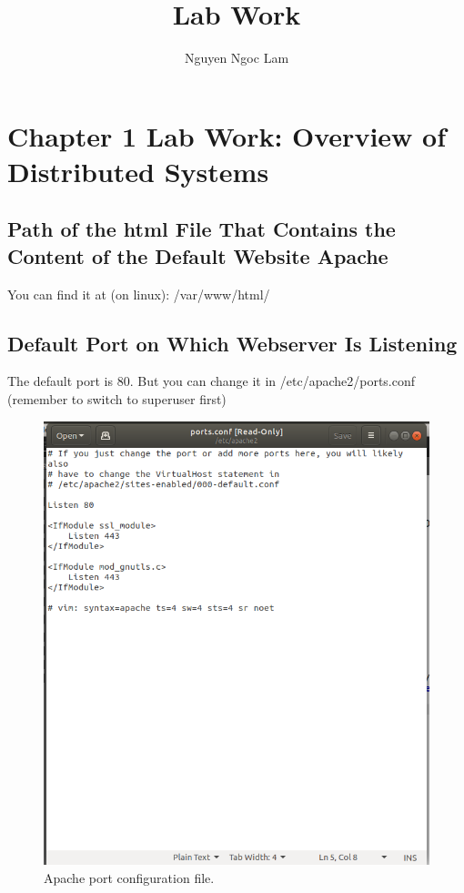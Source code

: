 \documentclass[11pt,a4paper]{report}
\title{Lab Work}
\date{\displaydate{date}}
\author{Nguyen Ngoc Lam}
\begin{document}
  	\tableofcontents
  	\newpage
	
	\chapter{Chapter 1 Lab Work: Overview of Distributed Systems}
	\newpage
	\section{Path of the html File That Contains the Content of the Default Website Apache}
	You can find it at (on linux): /var/www/html/
	\section{Default Port on Which Webserver Is Listening}
	The default port is 80. But you can change it in /etc/apache2/ports.conf (remember to switch to superuser first)
	\begin{figure}[h!]
  		\includegraphics[width=\linewidth]{apache-default-port.png}
  		\caption{Apache port configuration file.}
  		\label{fig:apacheconf}
	\end{figure}
	\newpage
\end{document}
